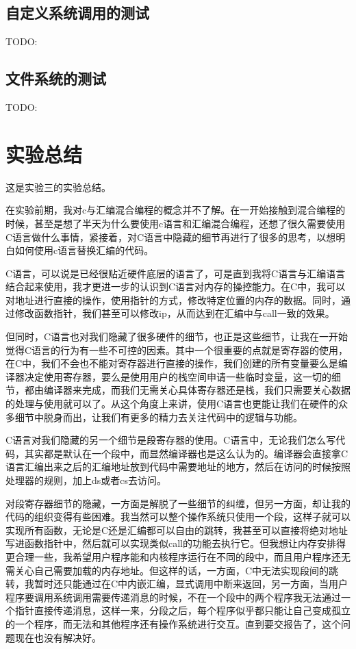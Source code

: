 \documentclass[forprint]{WHUBachelor}
\begin{document}
\section{自定义系统调用的测试}

TODO:

\section{文件系统的测试}

TODO:

\chapter{实验总结}

这是实验三的实验总结。

在实验前期，我对c与汇编混合编程的概念并不了解。在一开始接触到混合编程的时候，甚至是想了半天为什么要使用c语言和汇编混合编程，还想了很久需要使用C语言做什么事情，紧接着，对C语言中隐藏的细节再进行了很多的思考，以想明白如何使用c语言替换汇编的代码。

C语言，可以说是已经很贴近硬件底层的语言了，可是直到我将C语言与汇编语言结合起来使用，我才更进一步的认识到C语言对内存的操控能力。在C中，我可以对地址进行直接的操作，使用指针的方式，修改特定位置的内存的数据。同时，通过修改函数指针，我们甚至可以修改ip，从而达到在汇编中与call一致的效果。

但同时，C语言也对我们隐藏了很多硬件的细节，也正是这些细节，让我在一开始觉得C语言的行为有一些不可控的因素。其中一个很重要的点就是寄存器的使用，在C中，我们不会也不能对寄存器进行直接的操作，我们创建的所有变量要么是编译器决定使用寄存器，要么是使用用户的栈空间申请一些临时变量，这一切的细节，都由编译器来完成，而我们无需关心具体寄存器还是栈，我们只需要关心数据的处理与使用就可以了。从这个角度上来讲，使用C语言也更能让我们在硬件的众多细节中脱身而出，让我们有更多的精力去关注代码中的逻辑与功能。

C语言对我们隐藏的另一个细节是段寄存器的使用。C语言中，无论我们怎么写代码，其实都是默认在一个段中，而显然编译器也是这么认为的。编译器会直接拿C语言汇编出来之后的汇编地址放到代码中需要地址的地方，然后在访问的时候按照处理器的规则，加上ds或者cs去访问。

对段寄存器细节的隐藏，一方面是解脱了一些细节的纠缠，但另一方面，却让我的代码的组织变得有些困难。我当然可以整个操作系统只使用一个段，这样子就可以实现所有函数，无论是C还是汇编都可以自由的跳转，我甚至可以直接将绝对地址写进函数指针中，然后就可以实现类似call的功能去执行它。但我想让内存安排得更合理一些，我希望用户程序能和内核程序运行在不同的段中，而且用户程序还无需关心自己需要加载的内存地址。但这样的话，一方面，C中无法实现段间的跳转，我暂时还只能通过在C中内嵌汇编，显式调用中断来返回，另一方面，当用户程序要调用系统调用需要传递消息的时候，不在一个段中的两个程序我无法通过一个指针直接传递消息，这样一来，分段之后，每个程序似乎都只能让自己变成孤立的一个程序，而无法和其他程序还有操作系统进行交互。直到要交报告了，这个问题现在也没有解决好。
\end{document}

